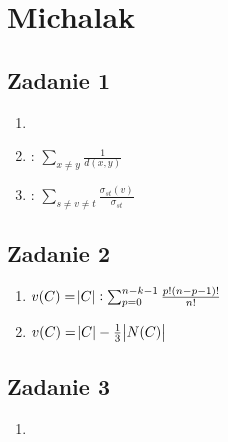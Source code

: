 \section{Michalak}

\subsection{Zadanie 1}
\begin{enumerate}
  \item
  \item
    :
        $\sum_{x\neq y}{\frac{1}{d(x,y)}}$
      \item
        :
        $\sum_{s\neq v \neq t} \frac{\sigma_{st}(v)}{\sigma_{st}}$

\end{enumerate}

\subsection{Zadanie 2}
\begin{enumerate}
  \item
    $v(C) = \abs{C}: \sum^{n - k - 1}_{p = 0} \frac{p! (n - p - 1)!}{n!}$
  \item
    $ v(C) = \abs{C} - \frac{1}{3} \abs{N(C)} $
\end{enumerate}

\subsection{Zadanie 3}
\begin{enumerate}
  \item
\end{enumerate}

